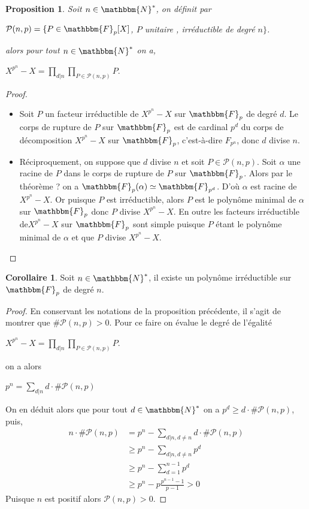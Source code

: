 \documentclass[12pt]{article}
\newcommand{\N}{\mathbbm{N}}
\newcommand{\F}{\mathbbm{F}}
\newtheorem{prop}{Proposition}
\theoremstyle{definition}
\newtheorem{coro}{Corollaire}
\begin{document}
\begin{prop}
Soit $n \in \N^{*}$, on définit par
\begin{center}
$\mathcal{P} (n,p) = \{ P \in \F_p [X]$, $P$ unitaire , irréductible de degré $n \}$.
\end{center}
alors pour tout $n \in \N^{*}$ on a,
\begin{center}
$\displaystyle X^{p^n} - X = \prod_{d | n} \prod_{P \in \mathcal{P}(n,p)} P.$
\end{center}
\end{prop}
\begin{proof}
\begin{itemize}
\item Soit $P$ un facteur irréductible de $X^{p^n} - X$ sur $\F_p$ de degré $d$. Le corps de rupture de $P$ sur $\F_p$ est de cardinal $p^d$ du corps de décomposition $X^{p^n} - X$ sur $\F_p$, c'est-à-dire $F_{p^n}$, donc $d$ divise $n$.
\item Réciproquement, on suppose que $d$ divise $n$ et soit $P \in \mathcal{P} (n,p)$. Soit $\alpha$ une racine de $P$ dans le corps de rupture de $P$ sur $\F_p$. Alors par le théorème ? on a $\F_p (\alpha) \simeq \F_{p^d}$. D'où $\alpha$ est racine de $X^{p^n} - X$. Or puisque $P$ est irréductible, alors $P$ est le polynôme minimal de $\alpha$ sur $\F_p$ donc $P$ divise $X^{p^n} - X$. En outre les facteurs irréductible de$X^{p^n} - X$ sur $\F_p$ sont simple puisque $P$ étant le polynôme minimal de $\alpha$ et que $P$ divise $X^{p^n} - X$.
\end{itemize}
\end{proof}
\begin{coro}
Soit $n \in \N^{*}$, il existe un polynôme irréductible sur $\F_p$ de degré $n$.
\end{coro}
\begin{proof}
En conservant les notations de la proposition précédente, il s'agit de montrer que $\# \mathcal{P} (n,p) > 0$. Pour ce faire on évalue le degré de l'égalité
\begin{center}
$\displaystyle X^{p^n} - X = \prod_{d | n} \prod_{P \in \mathcal{P}(n,p)} P.$
\end{center}
on a alors
\begin{center}
$\displaystyle p^n = \sum_{d | n} d \cdot \# \mathcal{P} (n,p)$
\end{center}
On en déduit alors que pour tout $d \in \N^{*}$ on a $p^d \geq d \cdot \# \mathcal{P} (n,p)$, puis,
\begin{align*}
\displaystyle
n \cdot \# \mathcal{P} (n,p) &= p^n - \sum_{d | n , d \neq n} d \cdot \# \mathcal{P} (n,p)\\
&\geq p^n - \sum_{d | n , d \neq n} p^d\\
&\geq p^n - \sum_{d =1}^{n-1} p^d\\
&\geq p^n - p \frac{p^{n-1} - 1}{p-1} > 0
\end{align*}
Puisque $n$ est positif alors $\mathcal{P} (n,p) > 0$.
\end{proof}
\end{document}
